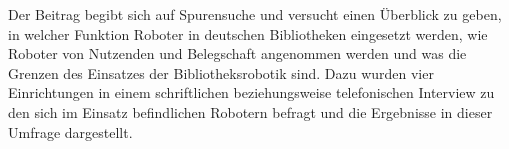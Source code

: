 Der Beitrag begibt sich auf Spurensuche und versucht einen Überblick zu
geben, in welcher Funktion Roboter in deutschen Bibliotheken eingesetzt
werden, wie Roboter von Nutzenden und Belegschaft angenommen werden und
was die Grenzen des Einsatzes der Bibliotheksrobotik sind. Dazu wurden
vier Einrichtungen in einem schriftlichen beziehungsweise telefonischen
Interview zu den sich im Einsatz befindlichen Robotern befragt und die
Ergebnisse in dieser Umfrage dargestellt.
